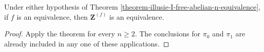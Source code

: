 \begin{corollary}
\label{corollary-illusie-I-free-abelian-equivalence}
Under either hypothesis of Theorem
\ref{theorem-illusie-I-free-abelian-n-equivalence}, if $f$ is an
equivalence, then $\mathbf{Z}^{(f)}$ is an equivalence.
\end{corollary}

\begin{proof}
Apply the theorem for every $n \geq 2$. The conclusions for $\pi_0$ and
$\pi_1$ are already included in any one of these applications.
\end{proof}
